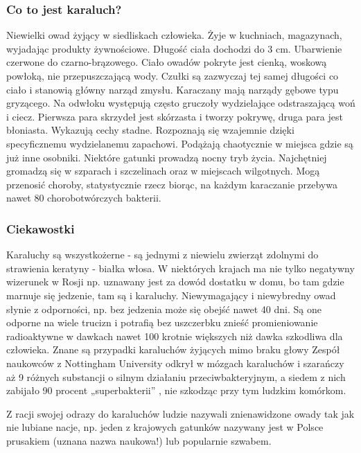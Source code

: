 \subsubsection{Co to jest karaluch?}
Niewielki owad żyjący w siedliskach człowieka. Żyje w kuchniach, magazynach, wyjadając produkty żywnościowe. Długość ciała dochodzi do 3 cm. Ubarwienie czerwone do czarno-brązowego.
Ciało owadów pokryte jest cienką, woskową powłoką, nie przepuszczającą wody. Czułki są zazwyczaj tej samej długości co ciało i stanowią główny narząd zmysłu. Karaczany mają narządy gębowe typu gryzącego. Na odwłoku występują często gruczoły wydzielające odstraszającą woń i ciecz. Pierwsza para skrzydeł jest skórzasta i tworzy pokrywę, druga para jest błoniasta.
Wykazują cechy stadne. Rozpoznają się wzajemnie dzięki specyficznemu wydzielanemu zapachowi. Podążają chaotycznie w miejsca gdzie są już inne osobniki. Niektóre gatunki prowadzą nocny tryb życia. Najchętniej gromadzą się w szparach i szczelinach oraz w miejscach wilgotnych. Mogą przenosić choroby, statystycznie rzecz biorąc, na każdym karaczanie przebywa nawet 80 chorobotwórczych bakterii.
\subsubsection{Ciekawostki} 
Karaluchy są wszystkożerne - są jednymi z niewielu zwierząt zdolnymi do strawienia keratyny - białka włosa.
W niektórych krajach ma nie tylko negatywny wizerunek w Rosji np. uznawany jest za dowód dostatku w domu, bo tam gdzie marnuje się jedzenie, tam są i karaluchy.
Niewymagający i niewybredny owad słynie z odporności, np. bez jedzenia może się obejść nawet 40 dni. Są one odporne na wiele trucizn i potrafią bez uszczerbku znieść promieniowanie radioaktywne w dawkach nawet 100 krotnie większych niż dawka szkodliwa dla człowieka. Znane są przypadki karaluchów żyjących mimo braku głowy
Zespół naukowców z Nottingham University odkrył w mózgach karaluchów i szarańczy aż 9 różnych substancji o silnym działaniu przeciwbakteryjnym, a siedem z nich zabijało 90 procent „superbakterii” , nie szkodząc przy tym ludzkim komórkom.

Z racji swojej odrazy do karaluchów ludzie nazywali znienawidzone owady tak jak nie lubiane nacje, np. jeden z krajowych gatunków nazywany jest w Polsce prusakiem (uznana nazwa naukowa!) lub popularnie szwabem.



